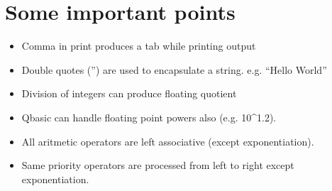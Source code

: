 \documentclass[a4paper,11pt]{article}
\begin{document}
 
 \section{\color{red}Some important points}
 
 \begin{itemize}
  \item Comma in print produces a tab while printing output
  \item Double quotes ('') are used to encapsulate a string. e.g. ``Hello World''
  \item Division of integers can produce floating quotient
  \item Qbasic can handle floating point powers also (e.g. 10\^{}1.2).
  \item All aritmetic operators are left associative (except exponentiation).
  \item Same priority operators are processed from left to right except exponentiation.
  
 \end{itemize}
\end{document}
